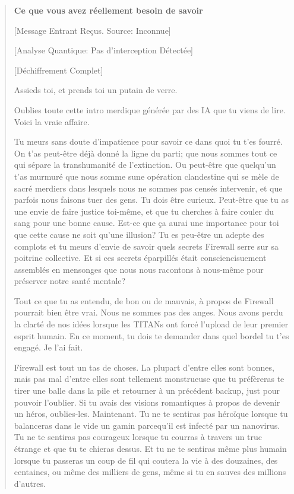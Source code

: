 \begin{quotation} 

\textbf{Ce que vous avez réellement besoin de savoir} 

[Message Entrant Reçus. Source: Inconnue] 

[Analyse Quantique: Pas d'interception Détectée] 

[Déchiffrement Complet] 

Assieds toi, et prends toi un putain de verre. 

Oublies toute cette intro merdique générée par des IA que tu viens de lire. Voici la vraie affaire. 

Tu meurs sans doute d'impatience pour savoir ce dans quoi tu t'es fourré. On t'as peut-être déjà donné la ligne du parti; que nous sommes tout ce qui sépare la transhumanité de l'extinction. Ou peut-être que quelqu'un t'as murmuré que nous somme sune opération clandestine qui se mèle de sacré merdiers dans lesquels nous ne sommes pas censés intervenir, et que parfois nous faisons tuer des gens. Tu dois être curieux. Peut-être que tu as une envie de faire justice toi-même, et que tu cherches à faire couler du sang pour une bonne cause. Est-ce que ça aurai une importance pour toi que cette cause ne soit qu'une illusion? Tu es peu-être un adepte des complots et tu meurs d'envie de savoir quels secrets Firewall serre sur sa poitrine collective. Et si ces secrets éparpillés était consciencisuement assemblés en mensonges que nous nous racontons à nous-même pour préserver notre santé mentale? 

Tout ce que tu as entendu, de bon ou de mauvais, à propos de Firewall pourrait bien être vrai. Nous ne sommes pas des anges. Nous avons perdu la clarté de nos idées lorsque les TITANs ont forcé l'upload de leur premier esprit humain. En ce moment, tu dois te demander dans quel bordel tu t'es engagé. Je l'ai fait. 

Firewall est tout un tas de choses. La plupart d'entre elles sont bonnes, mais pas mal d'entre elles sont tellement monstrueuse que tu préfèreras te tirer une balle dans la pile et retourner à un précédent backup, just pour pouvoir l'oublier. Si tu avais des visions romantiques à propos de devenir un héros, oublies-les. Maintenant. Tu ne te sentiras pas héroïque lorsque tu balanceras dans le vide un gamin parcequ'il est infecté par un nanovirus. Tu ne te sentiras pas courageux lorsque tu courras à travers un truc étrange et que tu te chieras dessus. Et tu ne te sentiras même plus humain lorsque tu passeras un coup de fil qui coutera la vie à des douzaines, des centaines, ou même des milliers de gens, même si tu en sauves des millions d'autres. 


\end{quotation}
